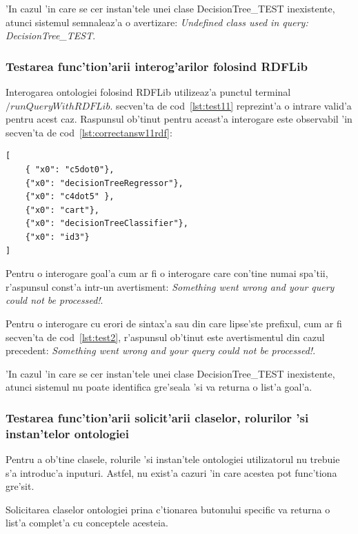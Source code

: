 \documentclass[12pt,a4paper,twoside]{report}
\begin{document}
'In cazul 'in care se cer instan'tele unei clase DecisionTree\_TEST inexistente, atunci sistemul semnaleaz'a o avertizare: {\it Undefined class used in query: DecisionTree\_TEST}.


\subsubsection{Testarea func'tion'arii interog'arilor folosind RDFLib}


Interogarea ontologiei folosind RDFLib utilizeaz'a punctul terminal $/runQueryWithRDFLib$.
secven'ta de cod~\ref{lst:test11} reprezint'a o intrare valid'a pentru acest caz. Raspunsul ob'tinut pentru aceast'a interogare este observabil 'in secven'ta de cod~\ref{lst:correctansw11rdf}:
\begin{lstlisting}[basicstyle=\footnotesize,  caption = R'aspuns la 'intrebarea $T_{11} prin RDFLib$, label=lst:correctansw11rdf]
[
    { "x0": "c5dot0"}, 
    {"x0": "decisionTreeRegressor"}, 
    {"x0": "c4dot5" }, 
    {"x0": "cart"}, 
    {"x0": "decisionTreeClassifier"}, 
    {"x0": "id3"}
]

\end{lstlisting}

Pentru o interogare goal'a cum ar fi o interogare care con'tine numai spa'tii, r'aspunsul const'a intr-un avertisment:  {\it  Something went wrong and your query could not be processed!}.

Pentru o interogare cu erori de sintax'a sau din care lipse'ste prefixul, cum ar fi secven'ta de cod~\ref{lst:test2}, r'aspunsul ob'tinut este avertismentul din cazul precedent:  {\it Something went wrong and your query could not be processed!}.

'In cazul 'in care se cer instan'tele unei clase DecisionTree\_TEST inexistente, atunci sistemul nu poate identifica gre'seala 'si va returna o list'a goal'a.

\subsubsection{Testarea func'tion'arii solicit'arii claselor, rolurilor 'si instan'telor ontologiei}
Pentru a ob'tine clasele, rolurile 'si instan'tele ontologiei utilizatorul nu trebuie s'a introduc'a inputuri. Astfel, nu exist'a cazuri 'in care acestea pot func'tiona gre'sit.

Solicitarea claselor ontologiei prina c'tionarea butonului specific va returna o list'a complet'a cu conceptele acesteia.
\end{document}
